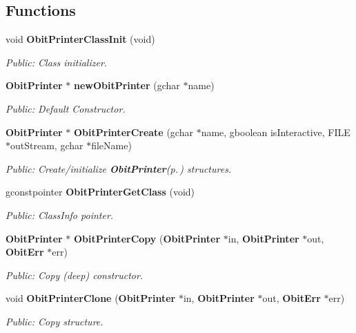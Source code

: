 \subsection*{Functions}
\begin{CompactItemize}
\item 
void {\bf Obit\-Printer\-Class\-Init} (void)
\begin{CompactList}\small\item\em Public: Class initializer. \item\end{CompactList}\item 
{\bf Obit\-Printer} $\ast$ {\bf new\-Obit\-Printer} (gchar $\ast$name)
\begin{CompactList}\small\item\em Public: Default Constructor. \item\end{CompactList}\item 
{\bf Obit\-Printer} $\ast$ {\bf Obit\-Printer\-Create} (gchar $\ast$name, gboolean is\-Interactive, FILE $\ast$out\-Stream, gchar $\ast$file\-Name)
\begin{CompactList}\small\item\em Public: Create/initialize {\bf Obit\-Printer}{\rm (p.\,\pageref{structObitPrinter})} structures. \item\end{CompactList}\item 
gconstpointer {\bf Obit\-Printer\-Get\-Class} (void)
\begin{CompactList}\small\item\em Public: Class\-Info pointer. \item\end{CompactList}\item 
{\bf Obit\-Printer} $\ast$ {\bf Obit\-Printer\-Copy} ({\bf Obit\-Printer} $\ast$in, {\bf Obit\-Printer} $\ast$out, {\bf Obit\-Err} $\ast$err)
\begin{CompactList}\small\item\em Public: Copy (deep) constructor. \item\end{CompactList}\item 
void {\bf Obit\-Printer\-Clone} ({\bf Obit\-Printer} $\ast$in, {\bf Obit\-Printer} $\ast$out, {\bf Obit\-Err} $\ast$err)
\begin{CompactList}\small\item\em Public: Copy structure. \item\end{CompactList}\item 

\end{CompactItemize}
